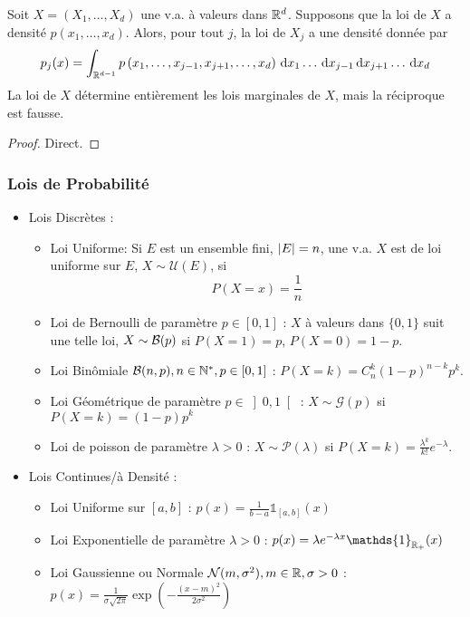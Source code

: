 \documentclass{cours}
\begin{document}
    \begin{proposition}
        Soit $X = \left(X_{1}, \ldots, X_{d}\right)$ une v.a. à valeurs dans $\mathbb{R}^{d}$. Supposons que la loi de $X$ a densité $p\left(x_{1}, \ldots, x_{d}\right)$. Alors, pour tout $j$, la loi de $X_{j}$ a une densité donnée par 
        \[
            p_{j}(x) = \int_{\mathbb{R}^{d - 1}} p\left(x_{1}, \ldots, x_{j - 1}, x_{j + 1}, \ldots, x_{d}\right){\rm \, d} x_{1} \ldots {\rm \, d} x_{j - 1} {\rm \, d} x_{j + 1}\ldots {\rm \, d} x_{d}
        \]
        La loi de $X$ détermine entièrement les lois marginales de $X$, mais la réciproque est fausse. 
    \end{proposition}
    \begin{proof}
        Direct.
    \end{proof}

    \subsubsection{Lois de Probabilité}
    \begin{definition}
        \begin{itemize}
            \item Lois Discrètes : 
            \begin{itemize}
                \item Loi Uniforme: Si $E$ est un ensemble fini, $\left|E\right| = n$, une v.a. $X$ est de loi uniforme sur $E$, $X \sim \mathcal{U}(E)$, si \[P(X = x) = \frac{1}{n}\]
                \item Loi de Bernoulli de paramètre $p \in \left[0, 1\right]$ : $X$ à valeurs dans $\{0, 1\}$ suit une telle loi, $X \sim \mathcal{B}(p)$ si $P(X = 1) = p$, $P(X = 0) = 1- p$.
                \item Loi Binômiale $\mathcal{B}(n, p), n\in \mathbb{N}^{*}, p\in\left[0, 1\right]$ : $P(X = k) = C_{n}^{k}\left(1 - p\right)^{n - k}p^{k}$. 
                \item Loi Géométrique de paramètre $p \in \left]0, 1\right[$ : $X \sim \mathcal{G}(p)$ si $P(X = k) = \left(1 - p\right)p^{k}$
                \item Loi de poisson de paramètre $\lambda > 0$ : $X \sim \mathcal{P}(\lambda)$ si $P(X = k) = \frac{\lambda^{k}}{k!}e^{-\lambda}$. 
            \end{itemize}
            \item Lois Continues/à Densité : 
            \begin{itemize}
                \item Loi Uniforme sur $\left[a, b\right]$ : $p(x) = \frac{1}{b - a}\mathds{1}_{\left[a, b\right]}(x)$
                \item Loi Exponentielle de paramètre $\lambda > 0$ : $p(x) = \lambda e^{-\lambda x}\mathds{1}_{\R_{+}}(x)$
                \item Loi Gaussienne ou Normale $\mathcal{N}(m,\sigma^{2}), m \in \mathbb{R}, \sigma > 0$ : $p(x) = \frac{1}{\sigma\sqrt{2\pi}} \exp\left(- \frac{\left(x - m\right)^{2}}{2 \sigma^{2}}\right)$
            \end{itemize}
        \end{itemize}
    \end{definition}
\end{document}
